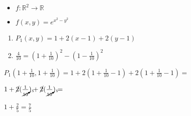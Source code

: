 \documentclass[../practica_05.tex]{subfiles}
\begin{document}
    \begin{itemize}
        \item $f: \mathbb{R}^2 \to \mathbb{R}$
        \item $f(x,y) = e^{x^2-y^2}$
    \end{itemize}

    \begin{enumerate}
        \item $P_1(x,y) = 1 + 2(x-1) + 2(y-1)$
        \item $\frac{4}{10} = (1+\frac{1}{10})^2 - (1-\frac{1}{10})^2 $
    \end{enumerate}

    $ P_1(1+\frac{1}{10},1+\frac{1}{10}) = 1 + 2(1+\frac{1}{10}-1) + 2(1+\frac{1}{10}-1) = $

    $ 1 + \cancel{2}(\frac{1}{\cancelto{5}{10}}) + \cancel{2}(\frac{1}{\cancelto{5}{10}}) = $

    $ 1 + \frac{2}{5} = \frac{7}{5}$
\end{document}
